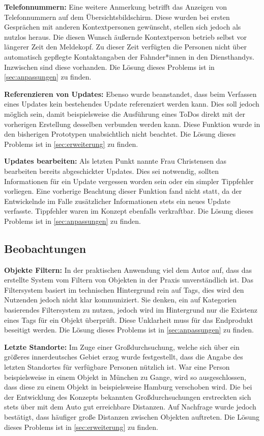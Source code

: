 \textbf{Telefonnummern:} Eine weitere Anmerkung betrifft das Anzeigen von Telefonnummern auf dem Übersichtsbildschirm.
Diese wurden bei ersten Gesprächen mit anderen Kontextpersonen gewünscht, stellen sich jedoch als nutzlos heraus.
Die diesen Wunsch äußernde Kontextperson betrieb selbst vor längerer Zeit den Meldekopf.
Zu dieser Zeit verfügten die Personen nicht über automatisch gepflegte Kontaktangaben der Fahnder*innen in den Diensthandys.
Inzwischen sind diese vorhanden.
Die Lösung dieses Problems ist in \autoref{sec:anpassungen} zu finden.

\textbf{Referenzieren von Updates:} Ebenso wurde beanstandet, dass beim Verfassen eines Updates kein bestehendes Update referenziert werden kann.
Dies soll jedoch möglich sein, damit beispielsweise die Ausführung eines ToDos direkt mit der vorherigen Erstellung desselben verbunden werden kann.
Diese Funktion wurde in den bisherigen Prototypen unabsichtlich nicht beachtet.
Die Lösung dieses Problems ist in \autoref{sec:erweiterung} zu finden.

\textbf{Updates bearbeiten:} Als letzten Punkt nannte Frau Christensen das bearbeiten bereits abgeschickter Updates.
Dies sei notwendig, sollten Informationen für ein Update vergessen worden sein oder ein simpler Tippfehler vorliegen.
Eine vorherige Beachtung dieser Funktion fand nicht statt, da der Entwickelnde im Falle zusätzlicher Informationen stets ein neues Update verfasste.
Tippfehler waren im Konzept ebenfalls verkraftbar.
Die Lösung dieses Problems ist in \autoref{sec:anpassungen} zu finden.

\subsection{Beobachtungen}\label{sec:feedbackMe}

\textbf{Objekte Filtern:} In der praktischen Anwendung viel dem Autor auf, dass das erstellte System vom Filtern von Objekten in der Praxis unverständlich ist.
Das Filtersystem basiert im technischen Hintergrund rein auf Tags, dies wird den Nutzenden jedoch nicht klar kommuniziert.
Sie denken, ein auf Kategorien basierendes Filtersystem zu nutzen, jedoch wird im Hintergrund nur die Existenz eines Tags für ein Objekt überprüft.
Diese Unklarheit muss für das Endprodukt beseitigt werden.
Die Lösung dieses Problems ist in \autoref{sec:anpassungen} zu finden.

\textbf{Letzte Standorte:} Im Zuge einer Großdurchsuchung, welche sich über ein größeres innerdeutsches Gebiet erzog wurde festgestellt, dass die Angabe des letzten Standortes für verfügbare Personen nützlich ist.
War eine Person beispielsweise in einem Objekt in München zu Gange, wird so ausgeschlossen, dass diese zu einem Objekt in beispielsweise Hamburg verschoben wird.
Die bei der Entwicklung des Konzepts bekannten Großdurchsuchungen erstreckten sich stets über mit dem Auto gut erreichbare Distanzen.
Auf Nachfrage wurde jedoch bestätigt, dass häufiger große Distanzen zwischen Objekten auftreten.
Die Lösung dieses Problems ist in \autoref{sec:erweiterung} zu finden.

